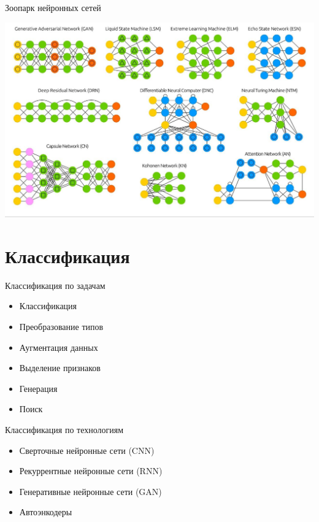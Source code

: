 \documentclass{beamer}
\begin{document}
\begin{frame}{Зоопарк нейронных сетей}
\begin{center}
\includegraphics[width=1.0\textwidth]{img/a3.jpg}
\end{center}
\end{frame}

\section{Классификация}


\begin{frame}{Классификация по задачам}


\begin{itemize}
\item Классификация
\item Преобразование типов
\item Аугментация данных
\item Выделение признаков
\item Генерация
\item Поиск
\end{itemize}
\end{frame}

\begin{frame}{Классификация по технологиям}


\begin{itemize}
\item Сверточные нейронные сети (CNN)
\item Рекуррентные нейронные сети (RNN)
\item Генеративные нейронные сети (GAN)
\item Автоэнкодеры
\end{itemize}
\end{frame}
\end{document}
